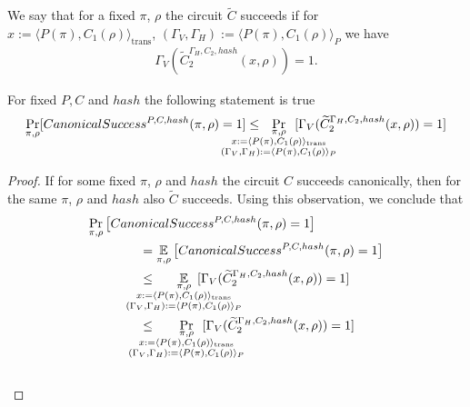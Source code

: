 We say that for a fixed $\pi$, $\rho$ the circuit $\widetilde{C}$ succeeds if
for $x := \langle P(\pi), C_1(\rho) \rangle_{\text{trans}}$,
$(\Gamma_V, \Gamma_H) := \langle P(\pi), C_1(\rho) \rangle_{P}$ we have
\begin{align*}
\Gamma_V(\widetilde{C}_2^{\Gamma_H, C_2, hash}(x, \rho)) = 1.
\end{align*}
%
\begin{lemma}
  \label{lemma:ctilda_c}
  For fixed $P, C$ and $hash$ the following statement is true
  \begin{align*}
    \underset{\pi, \rho}{\Pr}[CanonicalSuccess^{P, C, hash}(\pi, \rho) = 1]
    \leq
    \mkern13mu
    \underset{
      \mathclap{
      \substack{
        \pi, \rho \\
        x := \langle P(\pi), C_1(\rho) \rangle_{\text{trans}} \\
        (\Gamma_V, \Gamma_H) := \langle P(\pi), C_1(\rho) \rangle_{P}
      }}} {\Pr}\mkern13mu[\Gamma_V(\widetilde{C}_2^{\Gamma_H, C_2, hash}(x, \rho)) = 1]
  \end{align*}
\end{lemma}
%
\begin{proof}
If for some fixed $\pi$, $\rho$ and $hash$ the circuit $C$ succeeds canonically, then for the same $\pi$, $\rho$ and $hash$ also $\widetilde{C}$ succeeds.
Using this observation, we conclude that
\begin{align*}
  &\underset{\pi, \rho}{\Pr}\left[CanonicalSuccess^{P, C, hash}(\pi, \rho) = 1\right] \\
  &\IndII = \underset{\pi, \rho}{\mathbb{E}}\left[CanonicalSuccess^{P, C, hash}(\pi, \rho) = 1 \right] \\
  &\IndII \leq
  \mkern33mu
    \underset{
      \mathclap{
        \substack{\pi, \rho \\
        x := \langle P(\pi), C_1(\rho) \rangle_{\text{trans}} \\
        (\Gamma_V, \Gamma_H) := \langle P(\pi), C_1(\rho) \rangle_{P}
      }}}
    {\mathbb{E}}\mkern13mu[\Gamma_V(\widetilde{C}_2^{\Gamma_H, C_2, hash}(x, \rho)) = 1] \\
  &\IndII \leq
  \mkern33mu
    \underset{
      \mathclap{
        \substack{\pi, \rho \\
        x := \langle P(\pi), C_1(\rho) \rangle_{\text{trans}} \\
        (\Gamma_V, \Gamma_H) := \langle P(\pi), C_1(\rho) \rangle_{P}
      }}}
    {\Pr}\mkern13mu[\Gamma_V(\widetilde{C}_2^{\Gamma_H, C_2, hash}(x, \rho)) = 1]
\end{align*}
\\\text{  }
\end{proof}
